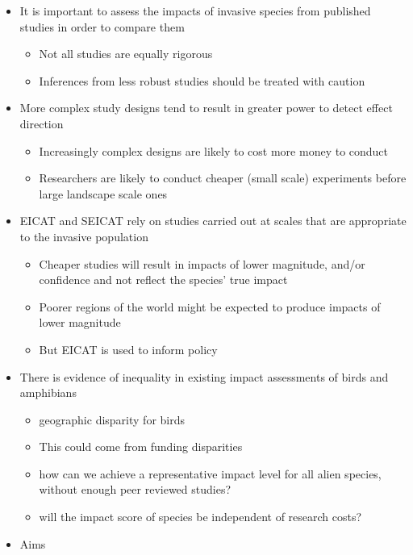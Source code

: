 \documentclass[
]{krantz}
\providecommand{\tightlist}{%
  \setlength{\itemsep}{0pt}\setlength{\parskip}{0pt}}
\begin{document}
\begin{itemize}
\tightlist
\item
  It is important to assess the impacts of invasive species from published studies in order to compare them

  \begin{itemize}
  \tightlist
  \item
    Not all studies are equally rigorous
  \item
    Inferences from less robust studies should be treated with caution
  \end{itemize}
\item
  More complex study designs tend to result in greater power to detect effect direction

  \begin{itemize}
  \tightlist
  \item
    Increasingly complex designs are likely to cost more money to conduct
  \item
    Researchers are likely to conduct cheaper (small scale) experiments before large landscape scale ones
  \end{itemize}
\item
  EICAT and SEICAT rely on studies carried out at scales that are appropriate to the invasive population

  \begin{itemize}
  \tightlist
  \item
    Cheaper studies will result in impacts of lower magnitude, and/or confidence and not reflect the species' true impact
  \item
    Poorer regions of the world might be expected to produce impacts of lower magnitude
  \item
    But EICAT is used to inform policy
  \end{itemize}
\item
  There is evidence of inequality in existing impact assessments of birds and amphibians

  \begin{itemize}
  \tightlist
  \item
    geographic disparity for birds
  \item
    This could come from funding disparities
  \item
    how can we achieve a representative impact level for all alien species, without enough peer reviewed studies?
  \item
    will the impact score of species be independent of research costs?
  \end{itemize}
\item
  Aims


\end{itemize}
\end{document}
